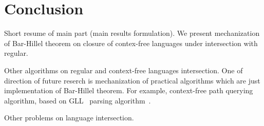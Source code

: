 \section{Conclusion}

Short resume of main part (main results formulation).
We present mechanization of Bar-Hillel theorem on closure of contex-free languages under intersection with regular.

Other algorithms on regular and context-free languages intersection.
One of direction of future reserch is mechanization of practical algorithms which are just implementation of Bar-Hillel theorem.
For example, context-free path querying algorithm, based on GLL~\cite{scott2010gll} parsing algorithm~\cite{grigorev2016context}.

Other problems on language intersection.

